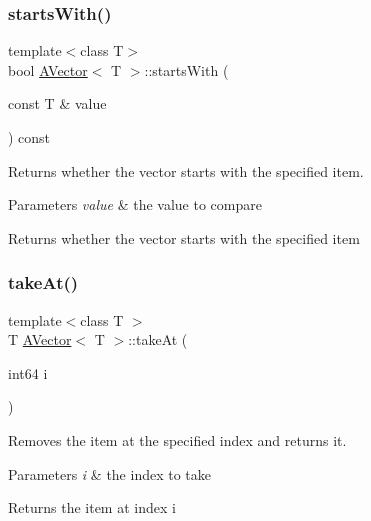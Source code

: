 \subsubsection{\texorpdfstring{startsWith()}{startsWith()}}
{\footnotesize\ttfamily template$<$class T$>$ \\
bool \mbox{\hyperlink{class_a_vector}{A\+Vector}}$<$ T $>$\+::starts\+With (\begin{DoxyParamCaption}\item[{const T \&}]{value }\end{DoxyParamCaption}) const}



Returns whether the vector starts with the specified item. 


\begin{DoxyParams}{Parameters}
{\em value} & the value to compare \\
\hline
\end{DoxyParams}
\begin{DoxyReturn}{Returns}
whether the vector starts with the specified item 
\end{DoxyReturn}
\mbox{\label{class_a_vector_af0be6b4c55d4e732f23e237ff299caa8}} 
\subsubsection{\texorpdfstring{takeAt()}{takeAt()}}
{\footnotesize\ttfamily template$<$class T $>$ \\
T \mbox{\hyperlink{class_a_vector}{A\+Vector}}$<$ T $>$\+::take\+At (\begin{DoxyParamCaption}\item[{int64}]{i }\end{DoxyParamCaption})}



Removes the item at the specified index and returns it. 


\begin{DoxyParams}{Parameters}
{\em i} & the index to take \\
\hline
\end{DoxyParams}
\begin{DoxyReturn}{Returns}
the item at index i 
\end{DoxyReturn}
\mbox{\label{class_a_vector_ae2cad9bb2968e2fe2c96554f6b36c4a9}} 
